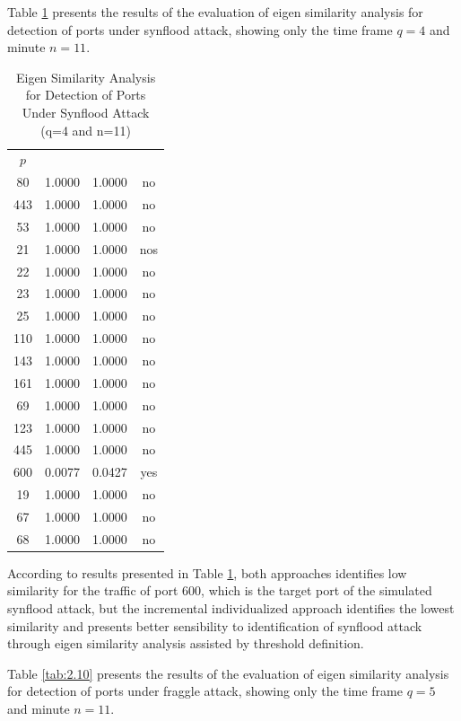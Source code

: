 Table \ref{tab:2.09} presents the results of the evaluation of eigen similarity analysis for detection of ports under synflood attack, showing only the time frame $q=4$ and minute $n=11$.

\begin{table}[h!]
  \centering
  \caption{Eigen Similarity Analysis for Detection of Ports Under Synflood Attack (q=4 and n=11)}
  \label{tab:2.09}
  \begin{tabular}{ c c c c }
	\toprule
	\multirow{2}{*}{\pmb{Port} $p$}   &\multicolumn{2}{c}{\pmb{Approaches}} &\multirow{2}{*}{\pmb{Ground Truth}}\\ 
			\hhline{~--~}
			&\pmb{Incremental Individualized} &\pmb{Individual}\\
	\midrule
	80 &1.0000 &1.0000 &no \\
	443 &1.0000 &1.0000 &no \\
	53 &1.0000 &1.0000 &no \\
	21 &1.0000 &1.0000 &nos \\
	22 &1.0000 &1.0000 &no \\
	23 &1.0000 &1.0000 &no \\
	25 &1.0000 &1.0000 &no \\
	110 &1.0000 &1.0000 &no \\
	143 &1.0000 &1.0000 &no \\
	161 &1.0000 &1.0000 &no \\
	69 &1.0000 &1.0000 &no \\
	123 &1.0000 &1.0000 &no \\
	445 &1.0000 &1.0000 &no \\
	600 &0.0077 &0.0427 &yes \\
	19 &1.0000 &1.0000 &no \\
	67 &1.0000 &1.0000 &no \\
	68 &1.0000 &1.0000 &no \\
    \bottomrule
  \end{tabular}
\end{table}

According to results presented in Table \ref{tab:2.09}, both approaches identifies low similarity for the traffic of port 600, which is the target port of the simulated synflood attack, but the incremental individualized approach identifies the lowest similarity and presents better sensibility to identification of synflood attack through eigen similarity analysis assisted by threshold definition.

Table \ref{tab:2.10} presents the results of the evaluation of eigen similarity analysis for detection of ports under fraggle attack, showing only the time frame $q=5$ and minute $n=11$.

